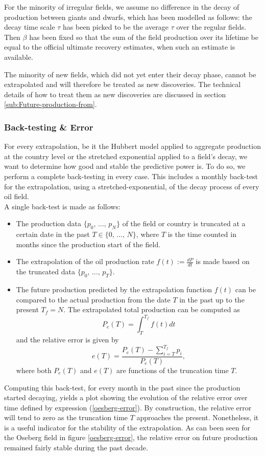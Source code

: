 \documentclass[review]{elsarticle}
\begin{document}
For the minority of irregular fields, we assume 
no difference in the decay of production between giants and dwarfs, which
has been modelled as follows: the decay time scale $\tau$ has been picked to be the average $\tau$ over
the regular fields. Then $\beta$ has been fixed so that the sum of
the field production over its lifetime be equal
to the official ultimate recovery estimates, when such an estimate
is available.

The minority of new fields, which did not yet enter their decay phase,
cannot be extrapolated and will therefore be treated as new discoveries.
The technical details of how to treat them as new discoveries are
discussed in section \ref{sub:Future-production-from}.


\subsubsection{Back-testing \& Error}

For every extrapolation, be it the Hubbert model applied to aggregate production at the country level or the stretched exponential applied to a field's decay, we want to determine how good and stable the predictive power is. To do so, we perform a complete back-testing in every case. This includes a monthly back-test for the extrapolation, using a stretched-exponential, of the decay process of every oil field.\\
A single back-test is made as follows:
\begin{itemize}
\item The production data $\{p_{0},\,\ldots,\, p_{N}\}$ of the field or country is truncated at a certain date in the past $T \in\{0,\,\ldots,\, N\}$, where
$T$ is the time counted in months since the production start of the field.
\item The extrapolation of the oil production rate
$f(t) := \frac{dP}{dt}$ is made based on the truncated data $\{p_{0},\,\ldots,\, p_{T}\}$.
\item The future production predicted by the extrapolation function $f(t)$ can be
compared to the actual production from the date $T$ in the past
up to the present $T_{f}=N$. The extrapolated total production can be
computed as 
\begin{equation}
P_{e}(T)=\int_{T}^{T_{f}}f(t)dt
\end{equation}
and the relative error is given by
\begin{equation}
e(T)=\frac{P_{e}(T)-\sum_{i=T}^{T_{f}}p_{i}}{P_{e}(T)},
\label{ryjryukoik}
\end{equation}
where both $P_{e}(T)$ and $e(T)$ are functions of the truncation time $T$.
\end{itemize}
Computing this back-test, for every month in the past since the production
started decaying, yields a plot showing the evolution of the relative
error over time defined by expression (\ref{oesberg-error}). By construction, the relative
error will tend to zero as the truncation time $T$ approaches the
present. Nonetheless, it is a useful indicator for the stability of
the extrapolation. As can been seen for the Oseberg field in figure \ref{oesberg-error}, the relative
error on future production remained fairly stable during the past
decade.
\end{document}
